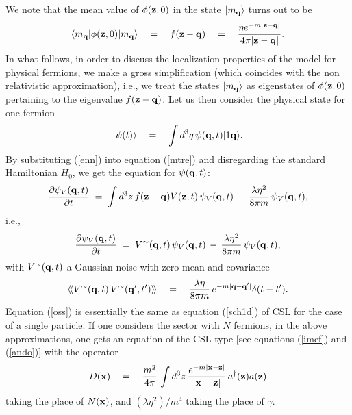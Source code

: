 \documentclass[12pt]{article}
\newcommand{\llangle}{\langle\!\langle}
\newcommand{\rrangle}{\rangle\!\rangle}
\begin{document}
We note that the mean value of $\phi({\bf z}, 0)$ in the state
$|m_{\bf q}\rangle$ turns out to be
\begin{equation}
\langle m_{\bf q}| \phi({\bf z}, 0) |m_{\bf q}\rangle \quad =
\quad f({\bf z} - {\bf q}) \quad = \quad \frac{\eta e^{-m|{\bf z}
- {\bf q}|}}{4\pi |{\bf z} - {\bf q}|}.
\end{equation}
In what follows, in order to discuss the localization properties
of the model for physical fermions, we make a gross simplification
(which coincides with the non relativistic approximation), i.e.,
we treat the states $|m_{\bf q}\rangle$ as eigenstates of
$\phi({\bf z}, 0)$ pertaining to the eigenvalue $f({\bf z} - {\bf
q})$. Let us then consider the physical state for one fermion
\begin{equation} \label{enn}
|\psi(t)\rangle \quad = \quad \int d^{3}q\, \psi({\bf q}, t)
|1{\bf q}\rangle.
\end{equation}
By substituting (\ref{enn}) into equation (\ref{mtre}) and
disregarding the standard Hamiltonian $H_{0}$, we get the equation
for $\psi({\bf q}, t)$:
\begin{equation} \label{pmse}
\frac{\partial \psi_{V}({\bf q}, t)}{\partial t} \;  = \; \int
d^{3}z\, f({\bf z} - {\bf q}) V({\bf z}, t)\, \psi_{V}({\bf q},
t)\, - \, \frac{\lambda \eta^{2}}{8\pi m}\, \psi_{V}({\bf q}, t),
\end{equation}
i.e.,
\begin{equation} \label{oss}
\frac{\partial \psi_{V}({\bf q}, t)}{\partial t} \;  = \;
V^{\sim}({\bf q}, t)\, \psi_{V}({\bf q}, t)\, - \, \frac{\lambda
\eta^{2}}{8\pi m}\, \psi_{V}({\bf q}, t),
\end{equation}
with $V^{\sim}({\bf q}, t)$ a Gaussian noise with zero mean and
covariance
\begin{equation}
\llangle V^{\sim}({\bf q}, t)\, V^{\sim}({\bf q}', t') \rrangle
\quad = \quad \frac{\lambda\eta}{8\pi m}\, e^{-m|{\bf q} - {\bf
q}'|} \delta(t-t').
\end{equation}
Equation (\ref{oss}) is essentially the same as equation
(\ref{sch1d}) of CSL for the case of a single particle. If one
considers the sector with $N$ fermions, in the above
approximations, one gets an equation of the CSL type [see
equations (\ref{imef}) and (\ref{ando})] with the operator
\begin{equation} \label{ndor}
D({\bf x}) \quad = \quad \frac{m^{2}}{4\pi}\,\int d^{3}z\,
\frac{e^{-m|{\bf x} - {\bf z}|}}{|{\bf x} - {\bf z}|}\,
a^{\dagger}({\bf z}) a({\bf z})
\end{equation}
taking the place of $N({\bf x})$, and $(\lambda\eta^{2})/m^{4}$
taking the place of $\gamma$.
\end{document}
